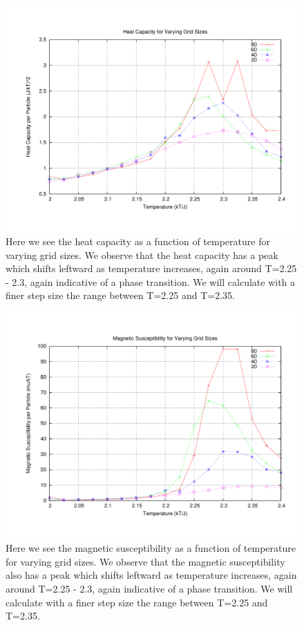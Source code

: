 \documentclass[11pt,a4paper]{article}
\begin{document}
\begin{figure}
\centering
\includegraphics[width=1.0\textwidth]{heatcapacity.pdf}
\caption{Here we see the heat capacity as a function of temperature for varying grid sizes. We observe that the heat capacity has a peak which shifts leftward as temperature increases, again around T=2.25 - 2.3, again indicative of a phase transition. We will calculate with a finer step size the range between T=2.25 and T=2.35.}
\end{figure}
\begin{figure}
\centering
\includegraphics[width=1.0\textwidth]{magsus.pdf}
\caption{Here we see the magnetic susceptibility as a function of temperature for varying grid sizes. We observe that the magnetic susceptibility also has a peak which shifts leftward as temperature increases, again around T=2.25 - 2.3, again indicative of a phase transition. We will calculate with a finer step size the range between T=2.25 and T=2.35.}
\end{figure}
\end{document}
